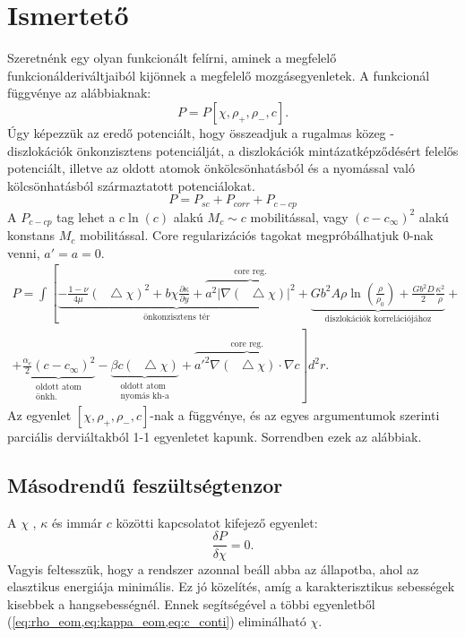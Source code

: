 \documentclass[10pt,a4paper]{scrartcl}
\newcommand*\Laplace{\mathop{}\!\mathbin\bigtriangleup}
\begin{document}
\tableofcontents

\section{Ismertető}
Szeretnénk egy olyan funkcionált felírni, aminek a megfelelő funkcionálderiváltjaiból kijönnek a megfelelő mozgásegyenletek. A funkcionál függvénye az alábbiaknak:
\[P=P\left[ {\chi ,{\rho _ + },{\rho _ - },c} \right].\]
Úgy képezzük az eredő potenciált, hogy összeadjuk a rugalmas közeg - diszlokációk önkonzisztens potenciálját, a diszlokációk mintázatképződésért felelős potenciált, illetve az oldott atomok önkölcsönhatásból és a nyomással való kölcsönhatásból származtatott potenciálokat.
\[P = {P_{sc}} + {P_{corr}} + {P_{c - cp}}\]
A $P_{c - cp}$ tag lehet a $c\ln \left( c \right)$ alakú $M_c \sim c$ mobilitással, vagy ${\left( {c - {c_\infty }} \right)^2}$ alakú konstans $M_c$ mobilitással. Core regularizációs tagokat megpróbálhatjuk 0-nak venni, $a' = a = 0$.
\begin{multline} \label{eq:plastic_pot}
P = \int \left[ \underbrace { - \frac{{1 - \nu }}{{4\mu }}{{\left( {\Laplace \chi } \right)}^2} + b\chi \frac{\partial \kappa}{\partial y} + \overbrace{a^2\left| {\nabla \left( \Laplace \chi  \right)} \right|^2}^{\text{core reg.}}}_{{\text{önkonzisztens tér}}} + \underbrace {G{b^2}A\rho \ln \left( {\frac{\rho }{{{\rho _0}}}} \right) + \frac{{G{b^2}D}}{2}\frac{{{\kappa ^2}}}{\rho }}_{{\text{diszlokációk korrelációjához}}} + \right. \\ 
\left. + \underbrace {\frac{\alpha_c}{2} {{\left( {c - {c_\infty }} \right)}^2}}_{\substack{\text{oldott atom}\\\text{önkh.}}} - \underbrace {\beta c\left( {\Laplace \chi } \right)}_{\substack{\text{oldott atom}\\\text{nyomás kh-a}}} + \overbrace {a{'^2}\nabla \left( \Laplace \chi  \right) \cdot \nabla c}^{{\text{core reg.}}}\right] {d^2}r.
\end{multline}
Az egyenlet $\left[ {\chi ,{\rho _ + },{\rho _ - },c} \right]$-nak a függvénye, és az egyes argumentumok szerinti parciális derviáltakból 1-1 egyenletet kapunk. Sorrendben ezek az alábbiak.
\subsection{Másodrendű feszültségtenzor}
A $\chi$ , $\kappa$ és immár $c$ közötti kapcsolatot kifejező egyenlet: 
\begin{equation}
\frac{{\delta P}}{{\delta \chi }} = 0.
\end{equation}
Vagyis feltesszük, hogy a rendszer azonnal beáll abba az állapotba, ahol az elasztikus energiája minimális. Ez jó közelítés, amíg a karakterisztikus sebességek kisebbek a hangsebességnél. Ennek segítségével a többi egyenletből (\cref{eq:rho_eom,eq:kappa_eom,eq:c_conti}) eliminálható $\chi$.
\end{document}
